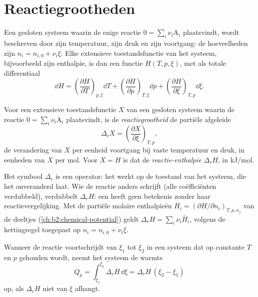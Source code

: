 \section{Reactiegrootheden}

Een gesloten systeem waarin de enige reactie $0 = \sum_i\nu_i\mathrm A_i$
plaatsvindt, wordt beschreven door zijn temperatuur, zijn druk en zijn voortgang:
de hoeveelheden zijn $n_i = n_{i,0} + \nu_i\xi$. Elke extensieve toestandsfunctie
van het systeem, bijvoorbeeld zijn enthalpie, is dan een functie $H(T, p,
\xi)$, met als totale differentiaal
\[
  \dd H = \left(\frac{\partial H}{\partial T}\right)_{p,\xi}\dd T
        + \left(\frac{\partial H}{\partial p}\right)_{T,\xi}\dd p
        + \left(\frac{\partial H}{\partial \xi}\right)_{T,p}\dd\xi .
\]

\begin{definition}\label{def:b2:reaction-enthalpy:reaction-quantity}
Voor een extensieve toestandsfunctie $X$ van een gesloten systeem waarin de
reactie $0 = \sum_i\nu_i\mathrm A_i$ plaatsvindt, is de
\emph{reactiegrootheid} de partiële afgeleide
\[
  \Delta_r X = \left(\frac{\partial X}{\partial \xi}\right)_{T,p} ,
\]
de verandering van $X$ per eenheid voortgang bij vaste temperatuur en druk, in
eenheden van $X$ per mol. Voor $X = H$ is dat de
\emph{reactie-enthalpie} $\Delta_r H$, in \unit{kJ/mol}.
\end{definition}

\begin{remark}\label{rem:b2:reaction-enthalpy:operator}
Het symbool $\Delta_r$ is een operator: het werkt op de toestand van het
systeem, die het onveranderd laat. Wie de reactie anders schrijft
(alle coëfficiënten verdubbeld), verdubbelt $\Delta_r H$: een 
heeft geen betekenis zonder haar reactievergelijking. Met de partiële molaire enthalpieën
$\bar H_i = (\partial H/\partial n_i)_{T,p,n_j}$ van de deeltjes
(\cref{ch:b2:chemical-potential}) geldt $\Delta_r H = \sum_i\nu_i\bar H_i$, volgens
de kettingregel toegepast op $n_i = n_{i,0} + \nu_i\xi$.
\end{remark}

\begin{proposition}\label{prop:b2:reaction-enthalpy:qp}
Wanneer de reactie voortschrijdt van $\xi_1$ tot $\xi_2$ in een systeem dat op
constante $T$ en $p$ gehouden wordt, neemt het systeem de warmte
\[
  Q_p = \int_{\xi_1}^{\xi_2}\Delta_r H\,\dd\xi = \Delta_r H\,(\xi_2 - \xi_1)
\]
op, als $\Delta_r H$ niet van $\xi$ afhangt.
\end{proposition}

